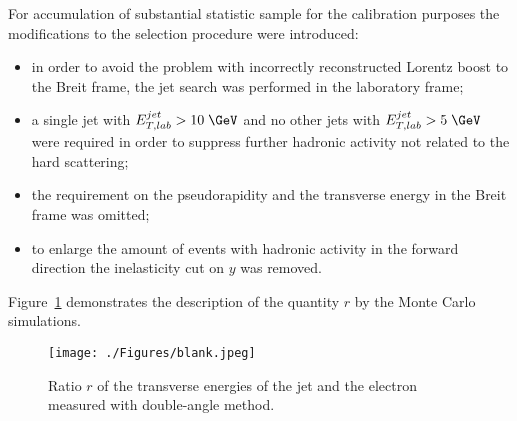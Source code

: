 For accumulation of substantial statistic sample for the calibration purposes the modifications to the selection procedure were introduced:
\begin{itemize}
	\item in order to avoid the problem with incorrectly reconstructed Lorentz boost to the Breit frame, the jet search was performed in the laboratory frame;
	\item a single jet with $\etjetlab > 10\; \GeV$ and no other jets with $\etjetlab > 5\; \GeV$ were required in order to suppress further hadronic activity not related to the hard scattering;
	\item the requirement on the pseudorapidity and the transverse energy in the Breit frame was omitted;
	\item to enlarge the amount of events with hadronic activity in the forward direction the inelasticity cut on $y$ was removed.
\end{itemize}

Figure~\ref{fig:ratcalibcontrolplot} demonstrates the description of the quantity $r$ by the Monte Carlo simulations.
\begin{figure}[htbp]
	\centering
		\texttt{[image: ./Figures/blank.jpeg]} 
	\caption{Ratio $r$ of the transverse energies of the jet and the electron measured with double-angle method.}
	\label{fig:ratcalibcontrolplot}
\end{figure}

